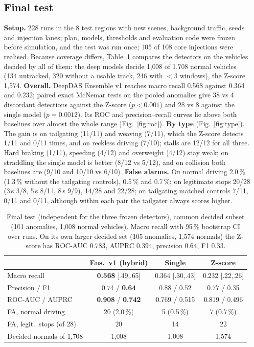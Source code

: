 \documentclass[10pt,a4paper,twocolumn]{article}
\newcommand{\EDIV}{DeepDAS Ensemble v1}\newcommand{\dev}{\textit{development}}\newcommand{\val}{\textit{validation}}\newcommand{\ft}{\textit{final test}}
\begin{document}
\subsection{Final test}
\textbf{Setup.} 228 runs in the 8 test regions with new scenes, background traffic, seeds and injection lanes; plan, models, thresholds and evaluation code were frozen before simulation, and the test was run once; 105 of 108 core injections were realised. Because coverage differs, Table~\ref{tab:ft} compares the detectors on the vehicles decided by all of them: the deep models decide 1{,}008 of 1{,}708 normal vehicles (134 untracked, 320 without a usable track, 246 with $<3$ windows), the Z-score 1{,}574.
\textbf{Overall.} \EDIV{} reaches macro recall 0.568 against 0.364 and 0.232; paired exact McNemar tests on the pooled anomalies give 38 vs 4 discordant detections against the Z-score ($p<0.001$) and 28 vs 8 against the single model ($p=0.0012$). Its ROC and precision--recall curves lie above both baselines over almost the whole range (Fig.~\ref{fig:roc}).
\textbf{By type} (Fig.~\ref{fig:type}). The gain is on tailgating (11/11) and weaving (7/11), which the Z-score detects 1/11 and 0/11 times, and on reckless driving (7/10); stalls are 12/12 for all three. Hard braking (1/11), speeding (4/12) and overweight (4/12) stay weak; on straddling the single model is better (8/12 vs 5/12), and on collision both baselines are (9/10 and 10/10 vs 6/10).
\textbf{False alarms.} On normal driving 2.0\,\% (1.3\,\% without the tailgating controls), 0.5\,\% and 0.7\,\%; on legitimate stops 20/28 (3\,s 3/8, 5\,s 8/11, 8\,s 9/9), 14/28 and 22/28; on tailgating matched controls 7/11, 0/11 and 0/11, although within each pair the tailgater always scores higher.

\begin{table}[t]\centering\footnotesize\setlength{\tabcolsep}{1.6pt}
\caption{Final test (independent for the three frozen detectors), common decided subset (101 anomalies, 1{,}008 normal vehicles). Macro recall with 95\,\% bootstrap CI over runs. On its own larger decided set (105 anomalies, 1{,}574 normals) the Z-score has ROC-AUC 0.783, AUPRC 0.394, precision 0.64, F1 0.33.}\label{tab:ft}
\begin{tabular}{@{}lccc@{}}\toprule
 & Ens.\ v1 (hybrid) & Single & Z-score \\\midrule
Macro recall & \textbf{0.568} [.49,.65] & 0.364 [.30,.43] & 0.232 [.22,.26] \\
Precision / F1 & 0.74 / \textbf{0.64} & 0.88 / 0.52 & 0.77 / 0.35 \\
ROC-AUC / AUPRC & \textbf{0.908} / \textbf{0.742} & 0.769 / 0.515 & 0.819 / 0.496 \\
FA, normal driving & 20 (2.0\,\%) & 5 (0.5\,\%) & 7 (0.7\,\%) \\
FA, legit.\ stops (of 28) & 20 & 14 & 22 \\
Decided normals of 1{,}708 & 1{,}008 & 1{,}008 & 1{,}574 \\\bottomrule
\end{tabular}\end{table}
\end{document}

